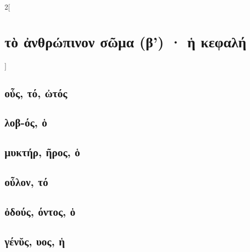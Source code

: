 \documentclass{book}
\begin{document}
\begin{multicols}{2}[\section{τὸ ἀνθρώπινον σῶμα (β') · ἡ κεφαλή}]
\subsection{οὖς, τό, ὠτός}
\subsection{λοβ-ός, ὁ}
\subsection{μυκτήρ, ῆρος, ὁ}
\subsection{οὖλον, τό}
\subsection{ὀδούς, όντος, ὁ}
\subsection{γένῠς, υος, ἡ}        

~
\end{multicols}
\newpage
\end{document}
